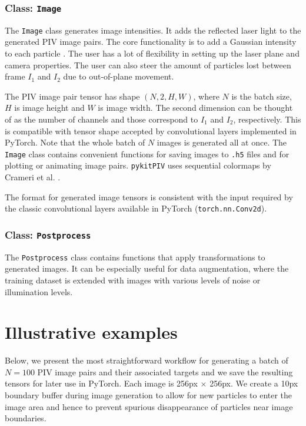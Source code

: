 \documentclass[a4paper,fleqn]{cas-dc}
\begin{document}
\subsubsection{Class: \texttt{Image}} \label{sec:class-Image}

The \texttt{Image} class generates image intensities. It adds the reflected laser light to the generated PIV image pairs. The core functionality is to add a Gaussian intensity to each particle \citep{olsen2000out, rabault2017performing}. The user has a lot of flexibility in setting up the laser plane and camera properties. The user can also steer the amount of particles lost between frame $I_1$ and $I_2$ due to out-of-plane movement.

The PIV image pair tensor has shape $(N, 2, H, W)$, where $N$ is the batch size, $H$ is image height and $W$ is image width. The second dimension can be thought of as the number of channels and those correspond to $I_1$ and $I_2$, respectively. This is compatible with tensor shape accepted by convolutional layers implemented in PyTorch. Note that the whole batch of $N$ images is generated all at once. The \texttt{Image} class contains convenient functions for saving images to \texttt{.h5} files and for plotting or animating image pairs. \texttt{pykitPIV} uses sequential colormaps by Crameri et al. \cite{crameri2020misuse}.

The format for generated image tensors is consistent with the input required by the classic convolutional layers available in PyTorch (\texttt{torch.nn.Conv2d}).

\subsubsection{Class: \texttt{Postprocess}} \label{sec:class-Postprocess}

The \texttt{Postprocess} class contains functions that apply transformations to generated images. It can be especially useful for data augmentation, where the training dataset is extended with images with various levels of noise or illumination levels.

\section{Illustrative examples} \label{sec:examples}

Below, we present the most straightforward workflow for generating a batch of $N=100$ PIV image pairs and their associated targets and we save the resulting tensors for later use in PyTorch. Each image is 256px $\times$ 256px. We create a 10px boundary buffer during image generation to allow for new particles to enter the image area and hence to prevent spurious disappearance of particles near image boundaries.
\end{document}
